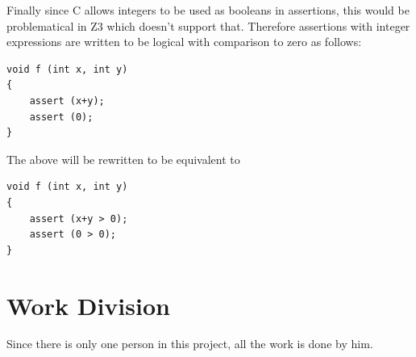 \documentclass[12pt,a4paper]{article}
\begin{document}
Finally since C allows integers to be used as booleans in assertions, this would be problematical in Z3 which doesn't support that. Therefore assertions with integer expressions are written to be logical with comparison to zero as follows:

\begin{lstlisting}  
void f (int x, int y) 
{ 	
	assert (x+y);
	assert (0);
}
\end{lstlisting}

The above will be rewritten to be equivalent to 
\begin{lstlisting}  
void f (int x, int y) 
{ 	
	assert (x+y > 0);
	assert (0 > 0);
}
\end{lstlisting}

\section{Work Division} 

Since there is only one person in this project, all the work is done by him. 




\end{document}
